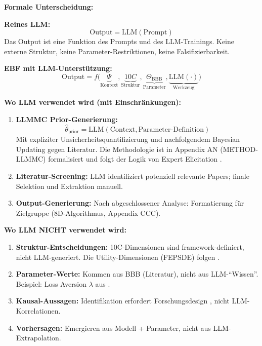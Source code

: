 \begin{tcolorbox}[colback=green!5!white, colframe=green!75!black,
    title=P1-$\mathcal{W}$-L: Lang (Wissenschaft)]

\textbf{Formale Unterscheidung:}

\textbf{Reines LLM:}
\begin{equation}
\text{Output} = \text{LLM}(\text{Prompt})
\end{equation}
Das Output ist eine Funktion des Prompts und des LLM-Trainings. Keine externe Struktur, keine Parameter-Restriktionen, keine Falsifizierbarkeit.

\textbf{EBF mit LLM-Unterstützung:}
\begin{equation}
\text{Output} = f\Big(\underbrace{\Psi}_{\text{Kontext}}, \underbrace{10C}_{\text{Struktur}}, \underbrace{\Theta_{\text{BBB}}}_{\text{Parameter}}, \underbrace{\text{LLM}(\cdot)}_{\text{Werkzeug}}\Big)
\end{equation}

\textbf{Wo LLM verwendet wird (mit Einschränkungen):}

\begin{enumerate}
    \item \textbf{LLMMC Prior-Generierung:}
    \begin{equation}
    \hat{\theta}_{\text{prior}} = \text{LLM}(\text{Context}, \text{Parameter-Definition})
    \end{equation}
    Mit expliziter Unsicherheitsquantifizierung und nachfolgendem Bayesian Updating gegen Literatur. Die Methodologie ist in Appendix AN (METHOD-LLMMC) formalisiert und folgt der Logik von Expert Elicitation \citep{ohaganelicitation}.

    \item \textbf{Literatur-Screening:}
    LLM identifiziert potenziell relevante Papers; finale Selektion und Extraktion manuell.

    \item \textbf{Output-Generierung:}
    Nach abgeschlossener Analyse: Formatierung für Zielgruppe (8D-Algorithmus, Appendix CCC).
\end{enumerate}

\textbf{Wo LLM NICHT verwendet wird:}

\begin{enumerate}
    \item \textbf{Struktur-Entscheidungen:} 10C-Dimensionen sind framework-definiert, nicht LLM-generiert. Die Utility-Dimensionen (FEPSDE) folgen \citet{fehr2002altruistic}.
    \item \textbf{Parameter-Werte:} Kommen aus BBB (Literatur), nicht aus LLM-``Wissen''. Beispiel: Loss Aversion $\lambda$ aus \citet{PAP-kahneman1979prospect}.
    \item \textbf{Kausal-Aussagen:} Identifikation erfordert Forschungsdesign \citep{PAP-camerer2003behavioral}, nicht LLM-Korrelationen.
    \item \textbf{Vorhersagen:} Emergieren aus Modell + Parameter, nicht aus LLM-Extrapolation.
\end{enumerate}


\end{tcolorbox}
